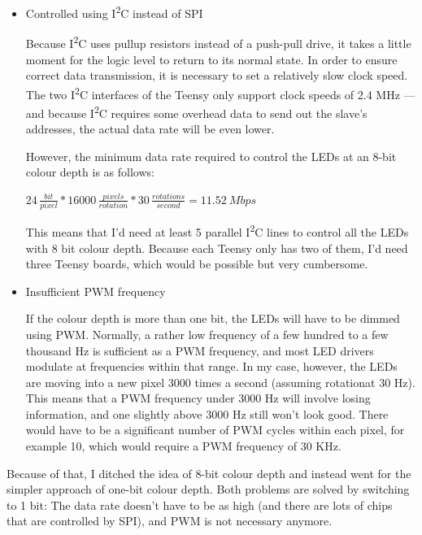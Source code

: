 \documentclass[a4paper, 11pt, titlepage]{report}
\def \iZc {I\textsuperscript{2}C\xspace}
\newenvironment{ownmath}
{\vspace{2mm}\hspace{15pt}\begin{math}}
{\end{math}\vspace{2mm}}
\begin{document}
\begin{itemize}

	\item Controlled using \iZc  instead of SPI

Because \iZc uses pullup resistors instead of a push-pull drive, it takes a little moment for the
logic level to return to its normal state. In order to ensure correct data transmission, it is
necessary to set a relatively slow clock speed. The two \iZc interfaces of the Teensy only support
clock speeds of 2.4 MHz --- and because \iZc requires some overhead data to send out the slave's
addresses, the actual data rate will be even lower.

However, the minimum data rate required to control the LEDs at an 8-bit colour depth is as follows:

\begin{ownmath}
24\,\frac{\si{bit}}{\si{pixel}} * 16000\,\frac{\si{pixels}}{\si{rotation}} * 30\,\frac{\si{rotations}}{\si{second}} = \SI{11.52}{Mbps}
\end{ownmath}

This means that I'd need at least 5 parallel \iZc lines to control all the LEDs with 8 bit colour
depth. Because each Teensy only has two of them, I'd need three Teensy boards, which would be
possible but very cumbersome.

	\item Insufficient PWM frequency

If the colour depth is more than one bit, the LEDs will have to be dimmed using PWM. Normally, a
rather low frequency of a few hundred to a few thousand Hz is sufficient as a PWM frequency, and
most LED drivers modulate at frequencies within that range. In my case, however, the LEDs are
moving into a new pixel 3000 times a second (assuming rotationat 30 Hz). This means that a PWM
frequency under 3000 Hz will involve losing information, and one slightly above 3000 Hz still
won't look good. There would have to be a significant number of PWM cycles within each pixel,
for example 10, which would require a PWM frequency of 30 KHz.

\end{itemize}

Because of that, I ditched the idea of 8-bit colour depth and instead went for the simpler approach
of one-bit colour depth. Both problems are solved by switching to 1 bit: The data rate doesn't have
to be as high (and there are lots of chips that are controlled by SPI), and PWM is not necessary
anymore.
\end{document}
